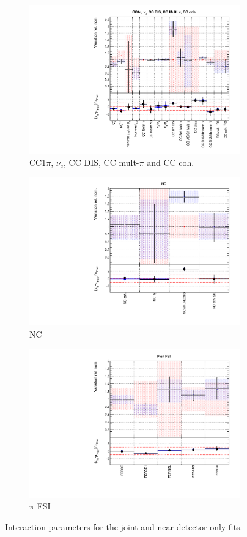 \begin{figure}[!htbp]
\begin{subfigure}{0.49\textwidth}
  \centering
  \includegraphics[width=0.9\linewidth]{figs/jointxsec3}
  \caption{CC1$\pi$, $\nu_e$, CC DIS, CC mult-$\pi$ and CC coh.}
\end{subfigure}
\begin{subfigure}{0.45\textwidth}
  \centering
  \includegraphics[width=0.9\linewidth]{figs/jointxsec4}
  \caption{NC}
\end{subfigure}
\begin{subfigure}{0.49\textwidth}
  \centering
  \includegraphics[width=0.9\linewidth]{figs/jointxsec5}
  \caption{$\pi$ FSI}
\end{subfigure}
\caption{Interaction parameters for the joint and near detector only fits.}
\label{fig:jointxsec}
\end{figure}

